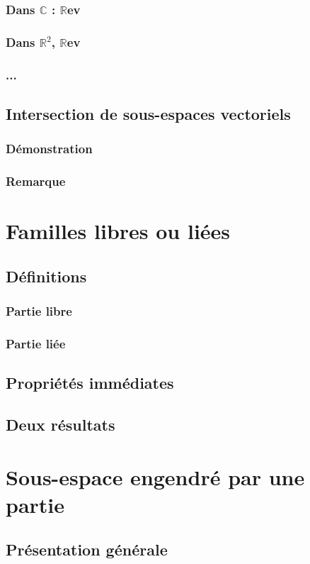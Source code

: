 \documentclass[12pt,a4paper,french]{book}
\begin{document}
			\subsubsection{Dans $\mathbb{C}$ : $\mathbb{R}$ev}
			\subsubsection{Dans $\mathbb{R}^2{}$, $\mathbb{R}$ev}
			\subsubsection{...}
		\subsection{Intersection de sous-espaces vectoriels}
			\subsubsection{Démonstration}
			\subsubsection{Remarque}
	\section{Familles libres ou liées}
		\subsection{Définitions}
			\subsubsection{Partie libre}
			\subsubsection{Partie liée}
		\subsection{Propriétés immédiates}
		\subsection{Deux résultats}
	\section{Sous-espace engendré par une partie}
		\subsection{Présentation générale}
\end{document}
